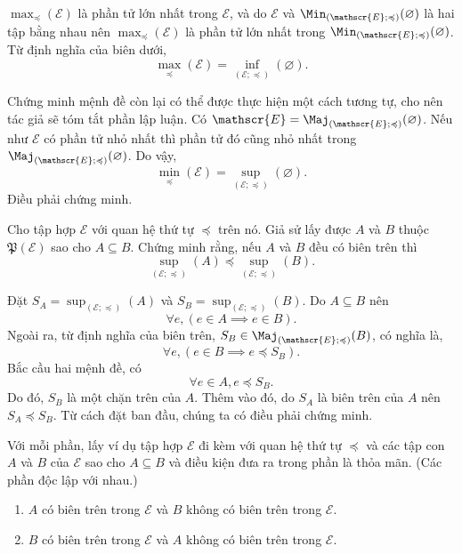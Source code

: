 $\max_\preccurlyeq(\mathscr{E})$ là phần tử lớn nhất trong $\mathscr{E}$, và do $\mathscr{E}$ và $\Min_{(\mathscr{E}; \preccurlyeq)}(\varnothing)$ là hai tập bằng nhau nên $\max_\preccurlyeq(\mathscr{E})$ là phần tử lớn nhất trong $\Min_{(\mathscr{E}; \preccurlyeq)}(\varnothing)$. Từ định nghĩa của biên dưới, \begin{equation*}
   \max_\preccurlyeq(\mathscr{E}) = \inf_{(\mathscr{E}; \preccurlyeq)}(\varnothing).
\end{equation*}

Chứng minh mệnh đề còn lại có thể được thực hiện một cách tương tự, cho nên tác giả sẽ tóm tắt phần lập luận. Có $\mathscr{E} = \Maj_{(\mathscr{E}; \preccurlyeq)}(\varnothing)$. Nếu như $\mathscr{E}$ có phần tử nhỏ nhất thì phần tử đó cũng nhỏ nhất trong $\Maj_{(\mathscr{E}; \preccurlyeq)}(\varnothing)$. Do vậy,
\begin{equation*}
   \min_\preccurlyeq(\mathscr{E}) = \sup_{(\mathscr{E}; \preccurlyeq)}(\varnothing).
\end{equation*}
Điều phải chứng minh.

\exercise Cho tập hợp $\mathscr{E}$ với quan hệ thứ tự $\preccurlyeq$ trên nó. Giả sử lấy được $A$ và $B$ thuộc $\mathfrak{P}(\mathscr{E})$ sao cho $A \subseteq B$. Chứng minh rằng, nếu $A$ và $B$ đều có biên trên thì \begin{equation*}
   \sup_{(\mathscr{E}; \preccurlyeq)}(A) \preccurlyeq \sup_{(\mathscr{E}; \preccurlyeq)}(B).
\end{equation*}

\solution 

Đặt $S_A = \sup_{(\mathscr{E}; \preccurlyeq)}(A)$ và $S_B = \sup_{(\mathscr{E}; \preccurlyeq)}(B)$. Do $A \subseteq B$ nên 
\begin{equation*}
   \forall e, (e \in A \implies e \in B).
\end{equation*} Ngoài ra, từ định nghĩa của biên trên, $S_B \in \Maj_{(\mathscr{E}; \preccurlyeq)}(B)$, có nghĩa là, \begin{equation*}
   \forall e, (e \in B \implies e \preccurlyeq S_B).
\end{equation*}
Bắc cầu hai mệnh đề, có 
\begin{equation*}
   \forall e \in A, e \preccurlyeq S_B.
\end{equation*}
Do đó, $S_B$ là một chặn trên của $A$. Thêm vào đó, do $S_A$ là biên trên của $A$ nên $S_A \preccurlyeq S_B$. Từ cách đặt ban đầu, chúng ta có điều phải chứng minh.

\exercise Với mỗi phần, lấy ví dụ tập hợp $\mathscr{E}$ đi kèm với quan hệ thứ tự $\preccurlyeq$ và các tập con $A$ và $B$ của $\mathscr{E}$ sao cho $A \subseteq B$ và điều kiện đưa ra trong phần là thỏa mãn. (Các phần độc lập với nhau.)
\begin{enumerate}
   \item $A$ có biên trên trong $\mathscr{E}$ và $B$ không có biên trên trong $\mathscr{E}$.
   \item $B$ có biên trên trong $\mathscr{E}$ và $A$ không có biên trên trong $\mathscr{E}$.
\end{enumerate}

